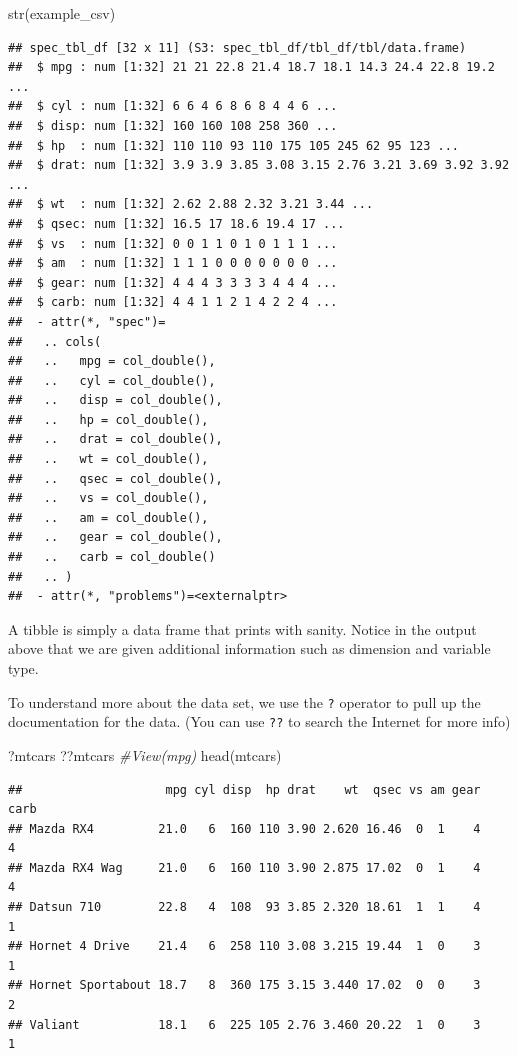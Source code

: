\documentclass[
]{book}
\newenvironment{Shaded}{\begin{snugshade}}{\end{snugshade}}
\newcommand{\CommentTok}[1]{\textcolor[rgb]{0.56,0.35,0.01}{\textit{#1}}}
\newcommand{\FunctionTok}[1]{\textcolor[rgb]{0.00,0.00,0.00}{#1}}
\newcommand{\NormalTok}[1]{#1}
\theoremstyle{definition}
\theoremstyle{definition}
\theoremstyle{definition}
\theoremstyle{definition}
\theoremstyle{remark}
\begin{document}
\begin{Shaded}
\begin{Highlighting}[]
\FunctionTok{str}\NormalTok{(example\_csv)}
\end{Highlighting}
\end{Shaded}

\begin{verbatim}
## spec_tbl_df [32 x 11] (S3: spec_tbl_df/tbl_df/tbl/data.frame)
##  $ mpg : num [1:32] 21 21 22.8 21.4 18.7 18.1 14.3 24.4 22.8 19.2 ...
##  $ cyl : num [1:32] 6 6 4 6 8 6 8 4 4 6 ...
##  $ disp: num [1:32] 160 160 108 258 360 ...
##  $ hp  : num [1:32] 110 110 93 110 175 105 245 62 95 123 ...
##  $ drat: num [1:32] 3.9 3.9 3.85 3.08 3.15 2.76 3.21 3.69 3.92 3.92 ...
##  $ wt  : num [1:32] 2.62 2.88 2.32 3.21 3.44 ...
##  $ qsec: num [1:32] 16.5 17 18.6 19.4 17 ...
##  $ vs  : num [1:32] 0 0 1 1 0 1 0 1 1 1 ...
##  $ am  : num [1:32] 1 1 1 0 0 0 0 0 0 0 ...
##  $ gear: num [1:32] 4 4 4 3 3 3 3 4 4 4 ...
##  $ carb: num [1:32] 4 4 1 1 2 1 4 2 2 4 ...
##  - attr(*, "spec")=
##   .. cols(
##   ..   mpg = col_double(),
##   ..   cyl = col_double(),
##   ..   disp = col_double(),
##   ..   hp = col_double(),
##   ..   drat = col_double(),
##   ..   wt = col_double(),
##   ..   qsec = col_double(),
##   ..   vs = col_double(),
##   ..   am = col_double(),
##   ..   gear = col_double(),
##   ..   carb = col_double()
##   .. )
##  - attr(*, "problems")=<externalptr>
\end{verbatim}

A tibble is simply a data frame that prints with sanity. Notice in the output above that we are given additional information such as dimension and variable type.

To understand more about the data set, we use the \texttt{?} operator to pull up the documentation for the data. (You can use \texttt{??} to search the Internet for more info)

\begin{Shaded}
\begin{Highlighting}[]
\NormalTok{?mtcars}
\NormalTok{??mtcars}
\CommentTok{\#View(mpg)}
\FunctionTok{head}\NormalTok{(mtcars)}
\end{Highlighting}
\end{Shaded}

\begin{verbatim}
##                    mpg cyl disp  hp drat    wt  qsec vs am gear carb
## Mazda RX4         21.0   6  160 110 3.90 2.620 16.46  0  1    4    4
## Mazda RX4 Wag     21.0   6  160 110 3.90 2.875 17.02  0  1    4    4
## Datsun 710        22.8   4  108  93 3.85 2.320 18.61  1  1    4    1
## Hornet 4 Drive    21.4   6  258 110 3.08 3.215 19.44  1  0    3    1
## Hornet Sportabout 18.7   8  360 175 3.15 3.440 17.02  0  0    3    2
## Valiant           18.1   6  225 105 2.76 3.460 20.22  1  0    3    1
\end{verbatim}
\end{document}
